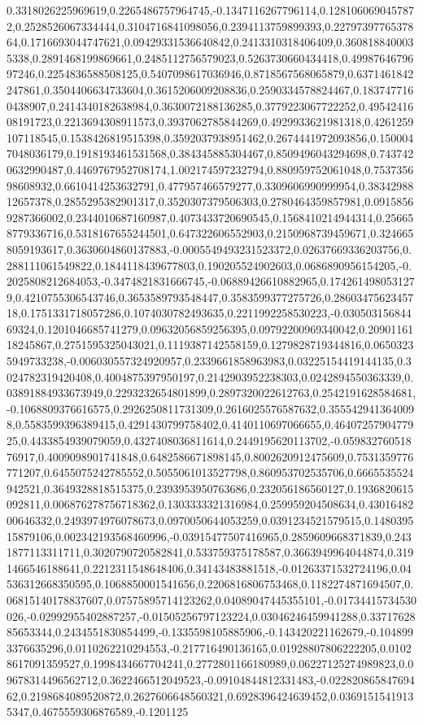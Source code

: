 0.3318026225969619,0.2265486757964745,-0.1347116267796114,0.1281060690457872,0.2528526067334444,0.3104716841098056,0.2394113759899393,0.2279739776537864,0.1716693044747621,0.09429331536640842,0.2413310318406409,0.3608188400035338,0.2891468199869661,0.2485112756579023,0.5263730660434418,0.4998764679697246,0.2254836588508125,0.5407098617036946,0.8718567568065879,0.6371461842247861,0.3504406634733604,0.3615206009208836,0.2590334578824467,0.1837477160438907,0.2414340182638984,0.3630072188136285,0.3779223067722252,0.4954241608191723,0.2213694308911573,0.3937062785844269,0.4929933621981318,0.4261259107118545,0.1538426819515398,0.3592037938951462,0.2674441972093856,0.1500047048036179,0.1918193461531568,0.384345885304467,0.8509496043294698,0.7437420632990487,0.4469767952708174,1.002174597232794,0.880959752061048,0.753735698608932,0.6610414253632791,0.477957466579277,0.3309606990999954,0.3834298812657378,0.2855295382901317,0.3520307379506303,0.2780464359857981,0.09158569287366002,0.2344010687160987,0.4073433720690545,0.1568410214944314,0.256658779336716,0.5318167655244501,0.647322606552903,0.2150968739459671,0.3246658059193617,0.3630604860137883,-0.0005549493231523372,0.02637669336203756,0.288111061549822,0.1844118439677803,0.190205524902603,0.0686890956154205,-0.2025808212684053,-0.3474821831666745,-0.06889426610882965,0.1742614980531279,0.4210755306543746,0.3653589793548447,0.3583599377275726,0.2860347562345718,0.1751331718057286,0.1074030782493635,0.2211992258530223,-0.03050315684469324,0.1201046685741279,0.09632056859256395,0.09792200969340042,0.2090116118245867,0.2751595325043021,0.1119387142558159,0.1279828719344816,0.06503235949733238,-0.006030557324920957,0.2339661858963983,0.03225154419144135,0.3024782319420408,0.4004875397950197,0.2142903952238303,0.0242894550363339,0.03891884933673949,0.2293232654801899,0.2897320022612763,0.2542191628584681,-0.1068809376616575,0.2926250811731309,0.2616025576587632,0.3555429413640098,0.5583599396389415,0.4291430799758402,0.4140110697066655,0.4640725790477925,0.4433854939079059,0.4327408036811614,0.2449195620113702,-0.05983276051876917,0.4009098901741848,0.6482586671898145,0.8002620912475609,0.7531359776771207,0.6455075242785552,0.5055061013527798,0.860953702535706,0.6665535524942521,0.3649328818515375,0.2393953950763686,0.232056186560127,0.1936820615092811,0.006876278756718362,0.1303333321316984,0.259959204508634,0.4301648200646332,0.2493974976078673,0.0970050644053259,0.0391234521579515,0.148039515879106,0.002342193568460996,-0.03915477507416965,0.2859609668371839,0.2431877113311711,0.3020790720582841,0.533759375178587,0.3663949964044874,0.3191466546188641,0.2212311548648406,0.34143483881518,-0.01263371532724196,0.04536312668350595,0.1068850001541656,0.2206816806753468,0.1182274871694507,0.06815140178837607,0.07575895714123262,0.04089047445355101,-0.01734415734530026,-0.02992955402887257,-0.01505256797123224,0.03046246459941288,0.3371762885653344,0.2434551830854499,-0.1335598105885906,-0.143420221162679,-0.1048993376635296,0.0110262210294553,-0.217716490136165,0.01928807806222205,0.01028617091359527,0.1998434667704241,0.2772801166180989,0.06227125274989823,0.09678314496562712,0.3622466512049523,-0.09104844812331483,-0.02282086584769462,0.2198684089520872,0.2627606648560321,0.6928396424639452,0.03691515419135347,0.4675559306876589,-0.1201125